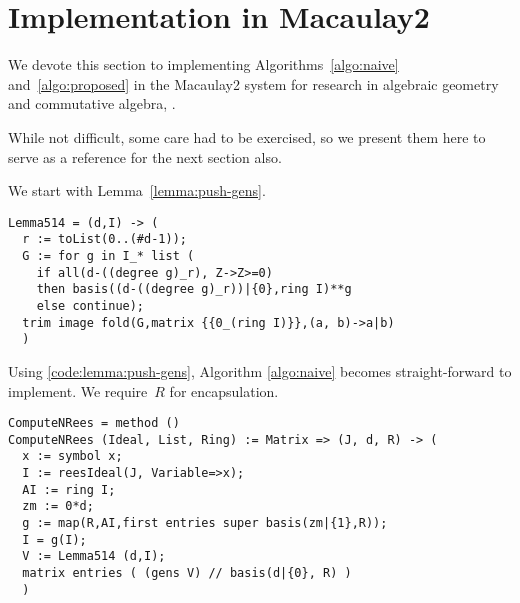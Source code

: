 \documentclass[fleqn,reqno]{amsart}
\numberwithin{first}{chapter}
\begin{document}
\section{Implementation in Macaulay2}
\label{sec:implementation}

\begin{paragraf*}
We devote this section to implementing Algorithms~\ref{algo:naive} and~\ref{algo:proposed}
in the Macaulay2 system for research in algebraic geometry and commutative algebra,
\citet{M2}.

While not difficult, some care had to be exercised, so we present them here to serve
as a reference for the next section also.
\end{paragraf*}

\begin{code}
\label{code:lemma:push-gens}
We start with Lemma~\ref{lemma:push-gens}.
\label{code:lemma:push-gens}
\begin{verbatim}
Lemma514 = (d,I) -> (
  r := toList(0..(#d-1));
  G := for g in I_* list (
    if all(d-((degree g)_r), Z->Z>=0)
    then basis((d-((degree g)_r))|{0},ring I)**g
    else continue);
  trim image fold(G,matrix {{0_(ring I)}},(a, b)->a|b)
  )
\end{verbatim}
\end{code}

\begin{code}
\label{code:algo:naive}
Using \eqref{code:lemma:push-gens},
Algorithm \ref{algo:naive} becomes straight-forward to implement.
We require~$R$ for encapsulation.
\begin{verbatim}
ComputeNRees = method ()
ComputeNRees (Ideal, List, Ring) := Matrix => (J, d, R) -> (
  x := symbol x;
  I := reesIdeal(J, Variable=>x);
  AI := ring I;
  zm := 0*d;
  g := map(R,AI,first entries super basis(zm|{1},R));
  I = g(I);
  V := Lemma514 (d,I);
  matrix entries ( (gens V) // basis(d|{0}, R) )
  )
\end{verbatim}
\end{code}
\end{document}
